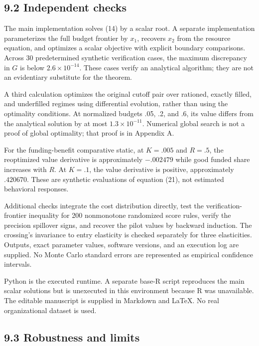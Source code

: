 \documentclass[
  11pt,
]{article}
\begin{document}
\subsection{9.2 Independent checks}\label{independent-checks}

The main implementation solves (14) by a scalar root. A separate
implementation parameterizes the full budget frontier by \(x_1\),
recovers \(x_2\) from the resource equation, and optimizes a scalar
objective with explicit boundary comparisons. Across 30 predetermined
synthetic verification cases, the maximum discrepancy in \(G\) is below
\(2.6\times10^{-14}\). These cases verify an analytical algorithm; they
are not an evidentiary substitute for the theorem.

A third calculation optimizes the original cutoff pair over rationed,
exactly filled, and underfilled regimes using differential evolution,
rather than using the optimality conditions. At normalized budgets .05,
.2, and .6, its value differs from the analytical solution by at most
\(1.3\times10^{-11}\). Numerical global search is not a proof of global
optimality; that proof is in Appendix A.

For the funding-benefit comparative static, at \(K=.005\) and \(R=.5\),
the reoptimized value derivative is approximately \(-.002479\) while
good funded share increases with \(R\). At \(K=.1\), the value
derivative is positive, approximately \(.420670\). These are synthetic
evaluations of equation (21), not estimated behavioral responses.

Additional checks integrate the cost distribution directly, test the
verification-frontier inequality for 200 nonmonotone randomized score
rules, verify the precision spillover signs, and recover the pilot
values by backward induction. The crossing's invariance to entry
elasticity is checked separately for three elasticities. Outputs, exact
parameter values, software versions, and an execution log are supplied.
No Monte Carlo standard errors are represented as empirical confidence
intervals.

Python is the executed runtime. A separate base-R script reproduces the
main scalar solutions but is unexecuted in this environment because R
was unavailable. The editable manuscript is supplied in Markdown and
LaTeX. No real organizational dataset is used.

\subsection{9.3 Robustness and limits}\label{robustness-and-limits}
\end{document}
